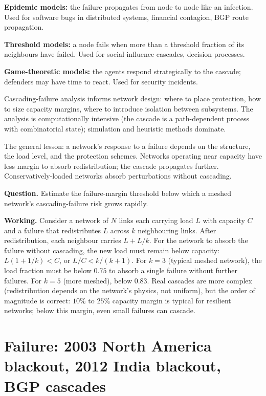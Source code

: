 \textbf{Epidemic models:} the failure propagates from node to node like an infection. Used for software bugs in distributed systems, financial contagion, BGP route propagation.

\textbf{Threshold models:} a node fails when more than a threshold fraction of its neighbours have failed. Used for social-influence cascades, decision processes.

\textbf{Game-theoretic models:} the agents respond strategically to the cascade; defenders may have time to react. Used for security incidents.

Cascading-failure analysis informs network design: where to place protection, how to size capacity margins, where to introduce isolation between subsystems. The analysis is computationally intensive (the cascade is a path-dependent process with combinatorial state); simulation and heuristic methods dominate.

The general lesson: a network's response to a failure depends on the structure, the load level, and the protection schemes. Networks operating near capacity have less margin to absorb redistribution; the cascade propagates further. Conservatively-loaded networks absorb perturbations without cascading.

\begin{estimation}
\textbf{Question.} Estimate the failure-margin threshold below which a meshed network's cascading-failure risk grows rapidly.

\textbf{Working.} Consider a network of $N$ links each carrying load $L$ with capacity $C$ and a failure that redistributes $L$ across $k$ neighbouring links. After redistribution, each neighbour carries $L + L/k$. For the network to absorb the failure without cascading, the new load must remain below capacity: $L(1 + 1/k) < C$, or $L/C < k/(k+1)$. For $k = 3$ (typical meshed network), the load fraction must be below $0.75$ to absorb a single failure without further failures. For $k = 5$ (more meshed), below $0.83$. Real cascades are more complex (redistribution depends on the network's physics, not uniform), but the order of magnitude is correct: $10\%$ to $25\%$ capacity margin is typical for resilient networks; below this margin, even small failures can cascade.
\end{estimation}

\section{Failure: 2003 North America blackout, 2012 India blackout, BGP cascades}

